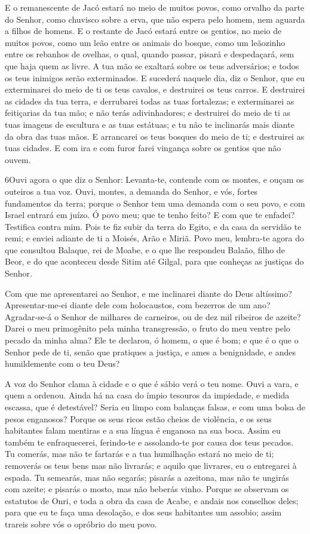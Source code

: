 E o remanescente de Jacó estará no meio de muitos povos, como
orvalho da parte do Senhor, como chuvisco sobre a erva, que não
espera pelo homem, nem aguarda a filhos de homens. E o restante
de Jacó estará entre os gentios, no meio de muitos povos, como um
leão entre os animais do bosque, como um leãozinho entre os rebanhos
de ovelhas, o qual, quando passar, pisará e despedaçará, sem que
haja quem as livre. A tua mão se exaltará sobre os teus
adversários; e todos os teus inimigos serão exterminados. E
sucederá naquele dia, diz o Senhor, que eu exterminarei do meio de
ti os teus cavalos, e destruirei os teus carros. E destruirei
as cidades da tua terra, e derrubarei todas as tuas fortalezas;
e exterminarei as feitiçarias da tua mão; e não terás
adivinhadores; e destruirei do meio de ti as tuas imagens de
escultura e as tuas estátuas; e tu não te inclinarás mais diante da
obra das tuas mãos. E arrancarei os teus bosques do meio de
ti; e destruirei as tuas cidades. E com ira e com furor farei
vingança sobre os gentios que não ouvem.

\medskip

\lettrine{6} Ouvi agora o que diz o Senhor: Levanta-te,
contende com os montes, e ouçam os outeiros a tua voz. Ouvi,
montes, a demanda do Senhor, e vós, fortes fundamentos da terra;
porque o Senhor tem uma demanda com o seu povo, e com Israel entrará
em juízo. Ó povo meu; que te tenho feito? E com que te enfadei?
Testifica contra mim. Pois te fiz subir da terra do Egito, e da
casa da servidão te remi; e enviei adiante de ti a Moisés, Arão e
Miriã. Povo meu, lembra-te agora do que consultou Balaque, rei
de Moabe, e o que lhe respondeu Balaão, filho de Beor, e do que
aconteceu desde Sitim até Gilgal, para que conheças as justiças do
Senhor.

Com que me apresentarei ao Senhor, e me inclinarei diante do Deus
altíssimo? Apresentar-me-ei diante dele com holocaustos, com
bezerros de um ano? Agradar-se-á o Senhor de milhares de
carneiros, ou de dez mil ribeiros de azeite? Darei o meu primogênito
pela minha transgressão, o fruto do meu ventre pelo pecado da minha
alma? Ele te declarou, ó homem, o que é bom; e que é o que o
Senhor pede de ti, senão que pratiques a justiça, e ames a
benignidade, e andes humildemente com o teu Deus?

A voz do Senhor clama à cidade e o que é sábio verá o teu nome.
Ouvi a vara, e quem a ordenou. Ainda há na casa do ímpio
tesouros da impiedade, e medida escassa, que é detestável?
Seria eu limpo com balanças falsas, e com uma bolsa de pesos
enganosos? Porque os seus ricos estão cheios de violência, e
os seus habitantes falam mentiras e a sua língua é enganosa na sua
boca. Assim eu também te enfraquecerei, ferindo-te e
assolando-te por causa dos teus pecados. Tu comerás, mas não
te fartarás e a tua humilhação estará no meio de ti; removerás os
teus bens mas não livrarás; e aquilo que livrares, eu o entregarei à
espada. Tu semearás, mas não segarás; pisarás a azeitona, mas
não te ungirás com azeite; e pisarás o mosto, mas não beberás vinho.
Porque se observam os estatutos de Onri, e toda a obra da
casa de Acabe, e andais nos conselhos deles; para que eu te faça uma
desolação, e dos seus habitantes um assobio; assim trareis sobre vós
o opróbrio do meu povo.

